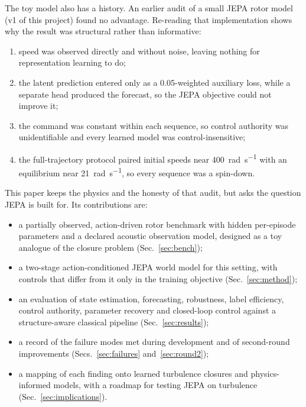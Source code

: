 \documentclass[10pt,journal]{IEEEtran}
\begin{document}
The toy model also has a history. An earlier audit of a small JEPA rotor model (v1 of this project) found no advantage. Re-reading that implementation shows why the result was structural rather than informative:
\begin{enumerate}
\item speed was observed directly and without noise, leaving nothing for representation learning to do;
\item the latent prediction entered only as a 0.05-weighted auxiliary loss, while a separate head produced the forecast, so the JEPA objective could not improve it;
\item the command was constant within each sequence, so control authority was unidentifiable and every learned model was control-insensitive;
\item the full-trajectory protocol paired initial speeds near \SI{400}{\radian\per\second} with an equilibrium near \SI{21}{\radian\per\second}, so every sequence was a spin-down.
\end{enumerate}

This paper keeps the physics and the honesty of that audit, but asks the question JEPA is built for. Its contributions are:
\begin{itemize}
\item a partially observed, action-driven rotor benchmark with hidden per-episode parameters and a declared acoustic observation model, designed as a toy analogue of the closure problem (Sec.~\ref{sec:bench});
\item a two-stage action-conditioned JEPA world model for this setting, with controls that differ from it only in the training objective (Sec.~\ref{sec:method});
\item an evaluation of state estimation, forecasting, robustness, label efficiency, control authority, parameter recovery and closed-loop control against a structure-aware classical pipeline (Sec.~\ref{sec:results});
\item a record of the failure modes met during development and of second-round improvements (Secs.~\ref{sec:failures} and~\ref{sec:round2});
\item a mapping of each finding onto learned turbulence closures and physics-informed models, with a roadmap for testing JEPA on turbulence (Sec.~\ref{sec:implications}).
\end{itemize}
\end{document}
